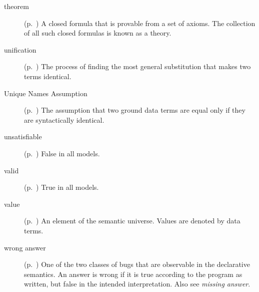 \begin{description}
\item[theorem]
(p.~\pageref{gi:theorem})
A closed formula that is provable from a set of axioms.
The collection of all such closed formulas is known as a theory.

\item[unification]
(p.~\pageref{sec:unification})
The process of finding the most general substitution
that makes two terms identical.

\item[Unique Names Assumption]
(p.~\pageref{gi:una})
The assumption that two ground data terms are equal
only if they are syntactically identical.

\item[unsatisfiable]
(p.~\pageref{gi:unsatisfiable})
False in all models.

\item[valid]
(p.~\pageref{gi:valid})
True in all models.

\item[value]
(p.~\pageref{gi:value})
An element of the semantic universe.
Values are denoted by data terms.

\item[wrong answer]
(p.~\pageref{gi:wrong-answer})
One of the two classes of bugs
that are observable in the declarative semantics.
An answer is wrong if it is true according to the program as written,
but false in the intended interpretation.
Also see \emph{missing answer}.

\end{description}

